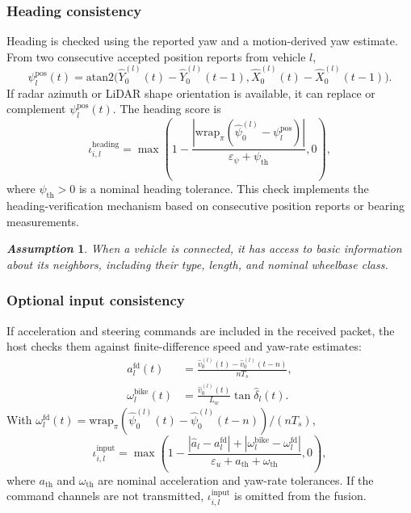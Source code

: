 \documentclass[journal,twoside]{IEEEtran}
\newtheorem{assumption}{\it Assumption}%
\begin{document}
\subsubsection{Heading consistency}
Heading is checked using the reported yaw and a motion-derived yaw estimate. From two consecutive accepted position reports from vehicle $l$,
\begin{equation*}
    \psi_{l}^{\mathrm{pos}}(t)=
    \mathrm{atan2}\big(\hat Y_0^{(l)}(t)-\hat Y_0^{(l)}(t-1),
    \hat X_0^{(l)}(t)-\hat X_0^{(l)}(t-1)\big).
\end{equation*}
If radar azimuth or LiDAR shape orientation is available, it can replace or complement $\psi_l^{\mathrm{pos}}(t)$. The heading score is
\begin{equation*}
    \iota_{i,l}^{\text{heading}} =
    \max\left(
    1-\frac{\left|\mathrm{wrap}_{\pi}(\hat{\psi}_0^{(l)}-\psi_l^{\mathrm{pos}})\right|}
    {\varepsilon_{\psi}+\psi_{\mathrm{th}}},
    0
    \right),
\end{equation*}
where $\psi_{\mathrm{th}}>0$ is a nominal heading tolerance. This check implements the heading-verification mechanism based on consecutive position reports or bearing measurements.
\begin{assumption}\label{assum_connect}
When a vehicle is connected, it has access to basic information about its neighbors, including their type, length, and nominal wheelbase class.
\end{assumption}

\subsubsection{Optional input consistency}
If acceleration and steering commands are included in the received packet, the host checks them against finite-difference speed and yaw-rate estimates:
\begin{align*}
    a_{l}^{\mathrm{fd}}(t)
    &=\frac{\hat v_0^{(l)}(t)-\hat v_0^{(l)}(t-n)}{nT_s},\\
    \omega_l^{\mathrm{bike}}(t)
    &=\frac{\hat v_0^{(l)}(t)}{L_w}\tan\hat\delta_l(t).
\end{align*}
With $\omega_l^{\mathrm{fd}}(t)=\mathrm{wrap}_{\pi}(\hat\psi_0^{(l)}(t)-\hat\psi_0^{(l)}(t-n))/(nT_s)$,
\begin{equation*}
    \iota_{i,l}^{\text{input}} =
    \max\left(
    1 -
    \frac{|\hat a_l-a_l^{\mathrm{fd}}|+|\omega_l^{\mathrm{bike}}-\omega_l^{\mathrm{fd}}|}
    {\varepsilon_u+a_{\mathrm{th}}+\omega_{\mathrm{th}}},
    0
    \right),
\end{equation*}
where $a_{\mathrm{th}}$ and $\omega_{\mathrm{th}}$ are nominal acceleration and yaw-rate tolerances. If the command channels are not transmitted, $\iota_{i,l}^{\text{input}}$ is omitted from the fusion.
\end{document}
